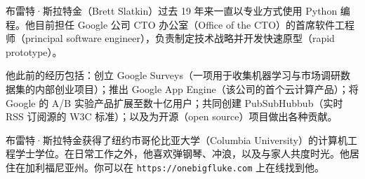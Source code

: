 布雷特·斯拉特金（Brett Slatkin）过去 19 年来一直以专业方式使用 Python 编程。他目前担任 Google 公司 CTO 办公室（Office of the CTO）的首席软件工程师（principal software engineer），负责制定技术战略并开发快速原型（rapid prototype）。

他此前的经历包括：创立 Google Surveys（一项用于收集机器学习与市场调研数据集的内部创业项目）；推出 Google App Engine（该公司的首个云计算产品）；将 Google 的 A/B 实验产品扩展至数十亿用户；共同创建 PubSubHubbub（实时 RSS 订阅源的 W3C 标准）；以及为开源（open source）项目做出各种贡献。

布雷特·斯拉特金获得了纽约市哥伦比亚大学（Columbia University）的计算机工程学士学位。在日常工作之外，他喜欢弹钢琴、冲浪，以及与家人共度时光。他居住在加利福尼亚州。你可以在 \texttt{https://onebigfluke.com} 上在线找到他。
